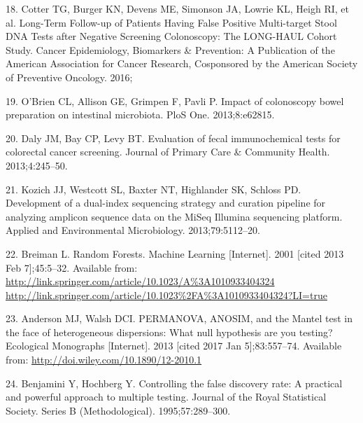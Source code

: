 \documentclass[12pt,]{article}
\begin{document}
\hypertarget{ref-cotter_long-term_2016}{}
18. Cotter TG, Burger KN, Devens ME, Simonson JA, Lowrie KL, Heigh RI,
et al. Long-Term Follow-up of Patients Having False Positive
Multi-target Stool DNA Tests after Negative Screening Colonoscopy: The
LONG-HAUL Cohort Study. Cancer Epidemiology, Biomarkers \& Prevention: A
Publication of the American Association for Cancer Research, Cosponsored
by the American Society of Preventive Oncology. 2016;

\hypertarget{ref-obrien_impact_2013}{}
19. O'Brien CL, Allison GE, Grimpen F, Pavli P. Impact of colonoscopy
bowel preparation on intestinal microbiota. PloS One. 2013;8:e62815.

\hypertarget{ref-daly_evaluation_2013}{}
20. Daly JM, Bay CP, Levy BT. Evaluation of fecal immunochemical tests
for colorectal cancer screening. Journal of Primary Care \& Community
Health. 2013;4:245--50.

\hypertarget{ref-kozich_development_2013}{}
21. Kozich JJ, Westcott SL, Baxter NT, Highlander SK, Schloss PD.
Development of a dual-index sequencing strategy and curation pipeline
for analyzing amplicon sequence data on the MiSeq Illumina sequencing
platform. Applied and Environmental Microbiology. 2013;79:5112--20.

\hypertarget{ref-breiman_random_2001}{}
22. Breiman L. Random Forests. Machine Learning {[}Internet{]}. 2001
{[}cited 2013 Feb 7{]};45:5--32. Available from:
\href{http://link.springer.com/article/10.1023/A\%3A1010933404324\%20http://link.springer.com/article/10.1023\%2FA\%3A1010933404324?LI=true}{http://link.springer.com/article/10.1023/A\%3A1010933404324 http://link.springer.com/article/10.1023\%2FA\%3A1010933404324?LI=true}

\hypertarget{ref-anderson_permanova_2013}{}
23. Anderson MJ, Walsh DCI. PERMANOVA, ANOSIM, and the Mantel test in
the face of heterogeneous dispersions: What null hypothesis are you
testing? Ecological Monographs {[}Internet{]}. 2013 {[}cited 2017 Jan
5{]};83:557--74. Available from:
\url{http://doi.wiley.com/10.1890/12-2010.1}

\hypertarget{ref-benjamini_controlling_1995}{}
24. Benjamini Y, Hochberg Y. Controlling the false discovery rate: A
practical and powerful approach to multiple testing. Journal of the
Royal Statistical Society. Series B (Methodological). 1995;57:289--300.
\end{document}
